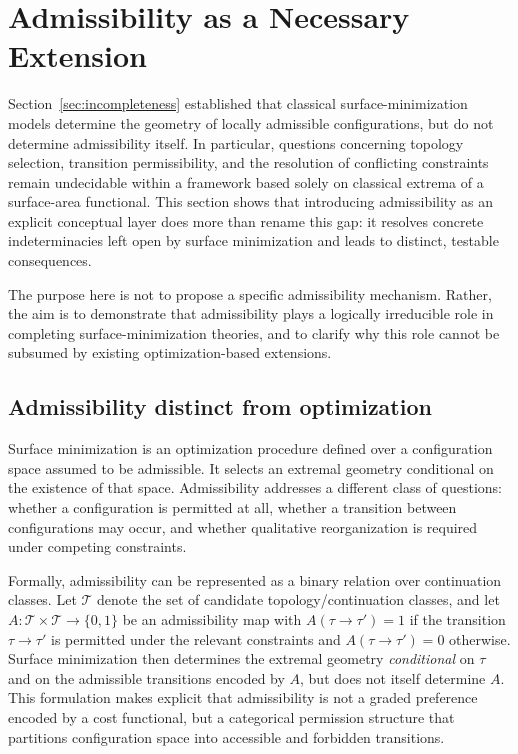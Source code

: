 \section{Admissibility as a Necessary Extension}
\label{sec:admissibility}

Section~\ref{sec:incompleteness} established that classical surface-minimization models determine the geometry of locally admissible configurations, but do not determine admissibility itself. In particular, questions concerning topology selection, transition permissibility, and the resolution of conflicting constraints remain undecidable within a framework based solely on classical extrema of a surface-area functional.\cite{Meng2026SurfaceOptimization} This section shows that introducing admissibility as an explicit conceptual layer does more than rename this gap: it resolves concrete indeterminacies left open by surface minimization and leads to distinct, testable consequences.

The purpose here is not to propose a specific admissibility mechanism. Rather, the aim is to demonstrate that admissibility plays a logically irreducible role in completing surface-minimization theories, and to clarify why this role cannot be subsumed by existing optimization-based extensions.

\subsection{Admissibility distinct from optimization}

Surface minimization is an optimization procedure defined over a configuration space assumed to be admissible. It selects an extremal geometry conditional on the existence of that space. Admissibility addresses a different class of questions: whether a configuration is permitted at all, whether a transition between configurations may occur, and whether qualitative reorganization is required under competing constraints.

Formally, admissibility can be represented as a binary relation over continuation classes. Let $\mathcal{T}$ denote the set of candidate topology/continuation classes, and let $A:\mathcal{T}\times\mathcal{T}\to\{0,1\}$ be an admissibility map with $A(\tau\!\to\!\tau')=1$ if the transition $\tau\to\tau'$ is permitted under the relevant constraints and $A(\tau\!\to\!\tau')=0$ otherwise. Surface minimization then determines the extremal geometry \emph{conditional} on $\tau$ and on the admissible transitions encoded by $A$, but does not itself determine $A$. This formulation makes explicit that admissibility is not a graded preference encoded by a cost functional, but a categorical permission structure that partitions configuration space into accessible and forbidden transitions.

